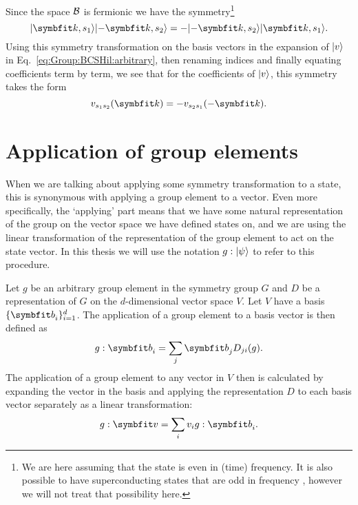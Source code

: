 Since the space $\mathcal{B}$ is fermionic we have the symmetry\footnote{We are here assuming that the state is even in (time) frequency. It is also possible
to have superconducting states that are odd in frequency \cite{Pal17}, however we will not treat that possibility here.}
\begin{equation}
    \label{eq:Group:BCSHil:fermSymm}
    \ket{\v{k},s_1}\ket{-\v{k},s_2} = -\ket{-\v{k},s_2}\ket{\v{k},s_1}.
\end{equation}
Using this symmetry transformation on the basis vectors in the expansion of $\lvert v \rangle$ in Eq.~\eqref{eq:Group:BCSHil:arbitrary}, then renaming indices
and finally equating coefficients term by term, we see that for the coefficients of $\lvert v \rangle$, this symmetry takes the form
\begin{equation}
    \label{eq:GroupBCSHil:fermSymmCoeff}
    v_{s_1s_2}(\v{k}) = -v_{s_2s_1}(-\v{k}).
\end{equation}


\section{Application of group elements}

When we are talking about applying some symmetry transformation to a state, this is synonymous with applying a group element to a vector.
Even more specifically, the `applying' part means that we have some natural representation of the group on the vector space we have defined
states on, and we are using the linear transformation of the representation of the group element to act on the state vector. In this
thesis we will use the notation $g:\lvert \psi \rangle$ to refer to this procedure.

Let $g$ be an arbitrary group element in the symmetry group $G$ and $D$ be a representation of $G$ on the $d$-dimensional vector space $V$.
Let $V$ have a basis $\{\v{b}_i\}_{i=1}^d$. The application of a group element to a basis vector is then defined as
\begin{equation}
    \label{eq:Group:Prod:basisApp}
    g:\v{b}_i = \sum_j\v{b}_jD_{ji}(g).
\end{equation}
The application of a group element to any vector in $V$ then is calculated by expanding the vector in the basis and applying the representation
$D$ to each basis vector separately as a linear transformation:
\begin{equation}
    \label{eq:Group:App:linearTransformApp}
    g:\v{v} = \sum_iv_ig:\v{b}_i.
\end{equation}

